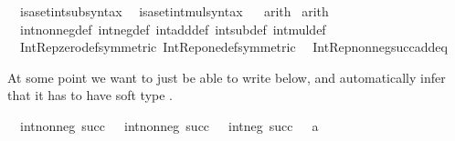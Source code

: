 \begin{isabellebody}
\ \ isa{\isacharunderscore}{\kern0pt}set{\isacharunderscore}{\kern0pt}int{\isacharunderscore}{\kern0pt}sub{\isacharunderscore}{\kern0pt}syntax\isanewline
\ \ isa{\isacharunderscore}{\kern0pt}set{\isacharunderscore}{\kern0pt}int{\isacharunderscore}{\kern0pt}mul{\isacharunderscore}{\kern0pt}syntax%
\isadelimdocument
%
\endisadelimdocument
%
\isatagdocument
%
\isamarkuptrue%
%
\endisatagdocument
{\isafolddocument}%
%
\isadelimdocument
%
\endisadelimdocument
{}\isamarkupfalse%
\ \isanewline
\isanewline
{}\isamarkupfalse%
\ arith\isanewline
{}\isamarkupfalse%
\ {\isacharbrackleft}{\kern0pt}arith{\isacharbrackright}{\kern0pt}\ {\isacharequal}{\kern0pt}\isanewline
\ \ int{\isacharunderscore}{\kern0pt}nonneg{\isacharunderscore}{\kern0pt}def\ int{\isacharunderscore}{\kern0pt}neg{\isacharunderscore}{\kern0pt}def\ int{\isacharunderscore}{\kern0pt}add{\isacharunderscore}{\kern0pt}def\ int{\isacharunderscore}{\kern0pt}sub{\isacharunderscore}{\kern0pt}def\ int{\isacharunderscore}{\kern0pt}mul{\isacharunderscore}{\kern0pt}def\isanewline
\ \ Int{\isacharunderscore}{\kern0pt}Rep{\isacharunderscore}{\kern0pt}zero{\isacharunderscore}{\kern0pt}def{\isacharbrackleft}{\kern0pt}symmetric{\isacharbrackright}{\kern0pt}\ Int{\isacharunderscore}{\kern0pt}Rep{\isacharunderscore}{\kern0pt}one{\isacharunderscore}{\kern0pt}def{\isacharbrackleft}{\kern0pt}symmetric{\isacharbrackright}{\kern0pt}\isanewline
\ \ Int{\isacharunderscore}{\kern0pt}Rep{\isacharunderscore}{\kern0pt}nonneg{\isacharunderscore}{\kern0pt}succ{\isacharunderscore}{\kern0pt}add{\isacharunderscore}{\kern0pt}eq%
\begin{isamarkuptext}%
At some point we want to just be able to write  below, and
automatically infer that it has to have soft type .%
\end{isamarkuptext}\isamarkuptrue%
\isamarkupfalse%
\isanewline
\ \ {\isachardoublequoteopen}int{\isacharunderscore}{\kern0pt}nonneg\ {\isacharparenleft}{\kern0pt}succ\ {}{\isacharparenright}{\kern0pt}\ {\isacharplus}{\kern0pt}\ int{\isacharunderscore}{\kern0pt}nonneg\ {\isacharparenleft}{\kern0pt}succ\ {}{\isacharparenright}{\kern0pt}\ {\isacharplus}{\kern0pt}\ int{\isacharunderscore}{\kern0pt}neg\ {\isacharparenleft}{\kern0pt}succ\ {}{\isacharparenright}{\kern0pt}\ {\isacharequal}{\kern0pt}\ {\isacharquery}{\kern0pt}a{\isachardoublequoteclose}\isanewline

\end{isabellebody}

